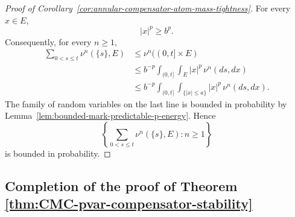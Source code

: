 \documentclass[a4paper,10pt]{article}
\begin{document}
\begin{proof}[Proof of Corollary~\ref{cor:annular-compensator-atom-mass-tightness}]
For every \(x\in E\),
\[
        |x|^p\ge b^p.
\]
Consequently, for every \(n\ge1\),
\[
\begin{aligned}
\sum_{0<s\le t}\nu^n(\{s\},E)
&\le
\nu^n((0,t]\times E)
\\
&\le
b^{-p}
\int_{(0,t]}\int_E
|x|^p\,\nu^n(ds,dx)
\\
&\le
b^{-p}
\int_{(0,t]}\int_{\{|x|\le a\}}
|x|^p\,\nu^n(ds,dx).
\end{aligned}
\]
The family of random variables on the last line is bounded in
probability by
Lemma~\ref{lem:bounded-mark-predictable-p-energy}. Hence
\[
\left\{
        \sum_{0<s\le t}\nu^n(\{s\},E)
        :
        n\ge1
\right\}
\]
is bounded in probability.
\end{proof}



\subsection{Completion of the proof of Theorem \ref{thm:CMC-pvar-compensator-stability}}
\end{document}
